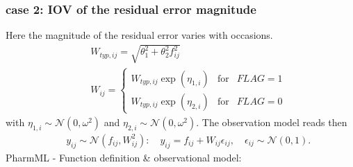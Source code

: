 \documentclass[a4paper,10pt]{article}
\begin{document}
\subsubsection{case 2: IOV of the residual error magnitude}
Here the magnitude of the residual error varies with occasions.
\begin{eqnarray}
&&W_{typ,ij} = \sqrt{\theta_1^2 + \theta_2^2 f_{ij}^2} \nonumber \\
&&W_{ij} = \left\{ \begin{array}{rcl} W_{typ,ij} \exp(\eta_{1,i})  & \mbox{for}  & FLAG  = 1 \\
W_{typ,ij} \exp(\eta_{2,i})    & \mbox{for} & FLAG  = 0 \nonumber
\end{array}\right.
\end{eqnarray}
with $\eta_{1,i} \sim \mathcal{N}(0,\omega^2)$ and $\eta_{2,i} \sim \mathcal{N}(0,\omega^2)$.
The observation model reads then
\begin{eqnarray}
&& y_{ij} \sim \mathcal{N}(f_{ij},W_{ij}^2): \quad y_{ij} = f_{ij} + W_{ij} \epsilon_{ij}, \quad \epsilon_{ij} \sim \mathcal{N}(0,1).	 \nonumber
\end{eqnarray}
PharmML - Function definition \& observational model:
\end{document}
